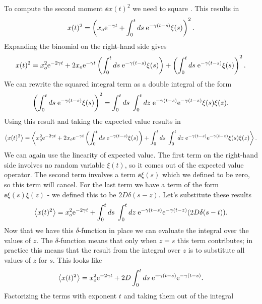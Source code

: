 To compute the second moment $\ee{x(t)^2}$ we need to square 
. This results in
\begin{equation}
  x(t)^2 =
  \left( x_o \mathrm{e}^{-\gamma t} + 
  \int_0^t ds \; \mathrm{e}^{-\gamma (t - s)} \xi(s) \right)^2.
\end{equation}
Expanding the binomial on the right-hand side gives
\begin{equation}
   x(t)^2 = x_o^2 \mathrm{e}^{-2\gamma t} +
   2 x_o \mathrm{e}^{-\gamma t} 
   \left( \int_0^t ds\; \mathrm{e}^{-\gamma (t - s)} \xi(s) \right) +
   \left( \int_0^t ds \; \mathrm{e}^{-\gamma(t - s)} \xi(s) \right)^2.
\end{equation}
We can rewrite the squared integral term as a double integral of the form
\begin{equation}
   \left( \int_0^t ds \; \mathrm{e}^{-\gamma(t - s)} \xi(s) \right)^2 =
   \int_0^t ds \; \int_0^t dz\; \mathrm{e}^{-\gamma (t - s)} \mathrm{e}^{-\gamma (t - z)}
   \xi(s) \xi(z).
\end{equation}
Using this result and taking the expected value results in
\begin{equation}
  \left\langle x(t)^2 \right\rangle = \left\langle 
   x_o^2 \mathrm{e}^{-2\gamma t} +
   2 x_o \mathrm{e}^{-\gamma t} 
   \left( \int_0^t ds\; \mathrm{e}^{-\gamma (t - s)} \xi(s) \right) +
   \int_0^t ds \; \int_0^t dz\; \mathrm{e}^{-\gamma (t - s)} \mathrm{e}^{-\gamma (t - z)}
   \xi(s) \xi(z)
   \right\rangle.
\end{equation}
We can again use the linearity of expected value. The first term on the
right-hand side involves no random variable $\xi(t)$, so it comes out of the
expected value operator. The second term involves a term $\ee{\xi(s)}$ which we
defined to be zero, so this term will cancel. For the last term we have a term
of the form $\ee{\xi(s)\xi(z)}$ - we defined this to be $2D \delta (s - z)$.
Let's substitute these results
\begin{equation}
  \left\langle x(t)^2 \right\rangle = 
   x_o^2 \mathrm{e}^{-2\gamma t} +
   \int_0^t ds\; \int_0^t dz\; \mathrm{e}^{-\gamma (t-s)} \mathrm{e}^{-\gamma (t-z)}
   (2D \delta(s - t)).
\end{equation}
Now that we have this $\delta$-function in place we can evaluate the integral
over the values of $z$. The $\delta$-function means that only when $z = s$ this
term contributes; in practice this means that the result from the integral over
$z$ is to substitute all values of $z$ for $s$. This looks like
\begin{equation}
  \left\langle x(t)^2 \right\rangle = 
   x_o^2 \mathrm{e}^{-2\gamma t} +
   2D \int_0^t ds \; \mathrm{e}^{-\gamma (t-s)} \mathrm{e}^{-\gamma (t-s)}.
\end{equation}
Factorizing the terms with exponent $t$ and taking them out of the integral
